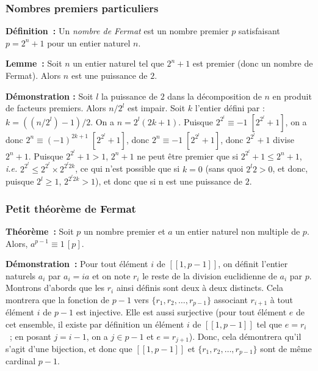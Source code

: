 \subsubsection{Nombres premiers particuliers}

\noindent\textbf{Définition :} Un \emph{nombre de Fermat} est un nombre premier $p$ satisfaisant $p = 2^n + 1$ pour un entier naturel $n$.

\medskip

\noindent\textbf{Lemme :} Soit $n$ un entier naturel tel que $2^n + 1$ est premier (donc un nombre de Fermat). 
    Alors $n$ est une puissance de $2$.

\medskip

\noindent\textbf{Démonstration :} Soit $l$ la puissance de $2$ dans la décomposition de $n$ en produit de facteurs premiers. 
    Alors $n / 2^l$ est impair. 
    Soit $k$ l'entier défini par : $k = ((n / 2^l) - 1) / 2$.
    On a $n = 2^l (2 k + 1)$. 
    Puisque $2^{2^l} \equiv -1 \; [2^{2^l} +1]$, on a donc $2^n \equiv (- 1)^{2 k + 1} \; [2^{2^l} + 1]$, donc $2^n \equiv - 1 \; [2^{2^l} +1]$, donc $2^{2^l} + 1$ divise $2^n + 1$. 
    Puisque $2^{2^l} + 1 > 1$, $2^n + 1$ ne peut être premier que si $2^{2^l} + 1 \leq 2^n + 1$, \emph{i.e.} $2^{2^l} \leq 2^{2^l} \times 2^{2^l 2 k}$, ce qui n'est possible que si $k = 0$ (sans quoi $2^l 2  > 0$, et donc, puisque $2^l \geq 1$, $2^{2^l 2 k} > 1$), et donc que si n est une puissance de $2$.

    \done

\subsubsection{Petit théorème de Fermat}

\noindent\textbf{Théorème :} Soit $p$ un nombre premier et $a$ un entier naturel non multiple de $p$. 
Alors, $a^{p-1} \equiv 1 \, [p]$.

\medskip

\noindent\textbf{Démonstration :} Pour tout élément $i$ de $[\![1, p-1]\!]$, on définit l'entier naturels $a_i$ par $a_i = i a$ et on note $r_i$ le reste de la division euclidienne de $a_i$ par $p$. 
Montrons d'abords que les $r_i$ ainsi définis sont deux à deux distincts. 
Cela montrera que la fonction de $p-1$ vers $\lbrace r_1, r_2, \dots, r_{p-1} \rbrace$ associant $r_{i+1}$ à tout élément $i$ de $p-1$ est injective.
Elle est aussi surjective (pour tout élément $e$ de cet ensemble, il existe par définition un élément $i$ de $[\![1,p-1]\!]$ tel que $e = r_i$ ; en posant $j = i-1$, on a $j \in p-1$ et $e = r_{j+1}$). 
Donc, cela démontrera qu'il s'agit d'une bijection, et donc que $[\![1, p-1]\!]$ et $\lbrace r_1, r_2, \dots, r_{p-1} \rbrace$ sont de même cardinal $p-1$.


